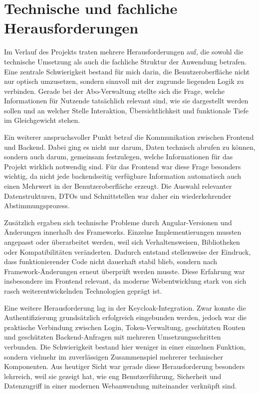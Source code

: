 \section{Technische und fachliche Herausforderungen}
Im Verlauf des Projekts traten mehrere Herausforderungen auf, die sowohl die technische Umsetzung als auch die fachliche Struktur der Anwendung betrafen. Eine zentrale Schwierigkeit bestand für mich darin, die Benutzeroberfläche nicht nur optisch umzusetzen, sondern sinnvoll mit der zugrunde liegenden Logik zu verbinden. Gerade bei der Abo-Verwaltung stellte sich die Frage, welche Informationen für Nutzende tatsächlich relevant sind, wie sie dargestellt werden sollen und an welcher Stelle Interaktion, Übersichtlichkeit und funktionale Tiefe im Gleichgewicht stehen.

Ein weiterer anspruchsvoller Punkt betraf die Kommunikation zwischen Frontend und Backend. Dabei ging es nicht nur darum, Daten technisch abrufen zu können, sondern auch darum, gemeinsam festzulegen, welche Informationen für das Projekt wirklich notwendig sind. Für das Frontend war diese Frage besonders wichtig, da nicht jede backendseitig verfügbare Information automatisch auch einen Mehrwert in der Benutzeroberfläche erzeugt. Die Auswahl relevanter Datenstrukturen, DTOs und Schnittstellen war daher ein wiederkehrender Abstimmungsprozess.

Zusätzlich ergaben sich technische Probleme durch Angular-Versionen und Änderungen innerhalb des Frameworks. Einzelne Implementierungen mussten angepasst oder überarbeitet werden, weil sich Verhaltensweisen, Bibliotheken oder Kompatibilitäten veränderten. Dadurch entstand stellenweise der Eindruck, dass funktionierender Code nicht dauerhaft stabil blieb, sondern nach Framework-Änderungen erneut überprüft werden musste. Diese Erfahrung war insbesondere im Frontend relevant, da moderne Webentwicklung stark von sich rasch weiterentwickelnden Technologien geprägt ist.

Eine weitere Herausforderung lag in der Keycloak-Integration. Zwar konnte die Authentifizierung grundsätzlich erfolgreich eingebunden werden, jedoch war die praktische Verbindung zwischen Login, Token-Verwaltung, geschützten Routen und geschützten Backend-Anfragen mit mehreren Umsetzungsschritten verbunden. Die Schwierigkeit bestand hier weniger in einer einzelnen Funktion, sondern vielmehr im zuverlässigen Zusammenspiel mehrerer technischer Komponenten. Aus heutiger Sicht war gerade diese Herausforderung besonders lehrreich, weil sie gezeigt hat, wie eng Benutzerführung, Sicherheit und Datenzugriff in einer modernen Webanwendung miteinander verknüpft sind.

